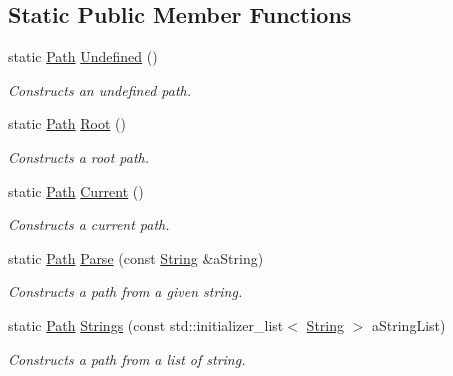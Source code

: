 \subsection*{Static Public Member Functions}
\begin{DoxyCompactItemize}
\item 
static \mbox{\hyperlink{classlibrary_1_1core_1_1fs_1_1_path}{Path}} \mbox{\hyperlink{classlibrary_1_1core_1_1fs_1_1_path_a0bb46bc56bc1bb180b114bae32477e06}{Undefined}} ()
\begin{DoxyCompactList}\small\item\em Constructs an undefined path. \end{DoxyCompactList}\item 
static \mbox{\hyperlink{classlibrary_1_1core_1_1fs_1_1_path}{Path}} \mbox{\hyperlink{classlibrary_1_1core_1_1fs_1_1_path_a59d9a7b2fcca844a82d22742b5a110ac}{Root}} ()
\begin{DoxyCompactList}\small\item\em Constructs a root path. \end{DoxyCompactList}\item 
static \mbox{\hyperlink{classlibrary_1_1core_1_1fs_1_1_path}{Path}} \mbox{\hyperlink{classlibrary_1_1core_1_1fs_1_1_path_adbdaa4e7ab2a1b399746782668863e53}{Current}} ()
\begin{DoxyCompactList}\small\item\em Constructs a current path. \end{DoxyCompactList}\item 
static \mbox{\hyperlink{classlibrary_1_1core_1_1fs_1_1_path}{Path}} \mbox{\hyperlink{classlibrary_1_1core_1_1fs_1_1_path_a6ba644b6609507e724c217bf2020f5ae}{Parse}} (const \mbox{\hyperlink{classlibrary_1_1core_1_1types_1_1_string}{String}} \&a\+String)
\begin{DoxyCompactList}\small\item\em Constructs a path from a given string. \end{DoxyCompactList}\item 
static \mbox{\hyperlink{classlibrary_1_1core_1_1fs_1_1_path}{Path}} \mbox{\hyperlink{classlibrary_1_1core_1_1fs_1_1_path_a94a2bd454a137249bab970e29a5a95f2}{Strings}} (const std\+::initializer\+\_\+list$<$ \mbox{\hyperlink{classlibrary_1_1core_1_1types_1_1_string}{String}} $>$ a\+String\+List)
\begin{DoxyCompactList}\small\item\em Constructs a path from a list of string. \end{DoxyCompactList}\end{DoxyCompactItemize}
